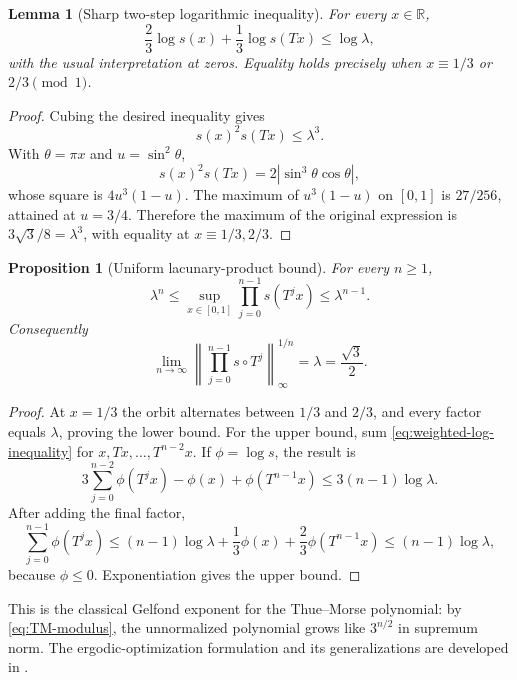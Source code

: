 \documentclass[11pt,oneside]{article}
\newtheorem{proposition}[proposition]{Proposition}
\newtheorem{lemma}[lemma]{Lemma}
\theoremstyle{definition}
\theoremstyle{remark}
\newcommand{\R}{\mathbb R}
\newcommand{\abs}[1]{\left|#1\right|}
\newcommand{\norm}[1]{\left\lVert#1\right\rVert}
\begin{document}
\begin{lemma}[Sharp two-step logarithmic inequality]
\label{lem:sharp-sine-inequality}
For every $x\in\R$,
\begin{equation}
 \frac23\log s(x)+\frac13\log s(Tx)\le\log\lambda,
 \label{eq:weighted-log-inequality}
\end{equation}
with the usual interpretation at zeros.  Equality holds precisely when
$x\equiv1/3$ or $2/3\pmod1$.
\end{lemma}

\begin{proof}
Cubing the desired inequality gives
\[
 s(x)^2s(Tx)\le\lambda^3.
\]
With $\theta=\pi x$ and $u=\sin^2\theta$,
\[
 s(x)^2s(Tx)=2\abs{\sin^3\theta\cos\theta},
\]
whose square is $4u^3(1-u)$.  The maximum of $u^3(1-u)$ on $[0,1]$ is $27/256$, attained
at $u=3/4$.  Therefore the maximum of the original expression is
$3\sqrt3/8=\lambda^3$, with equality at $x\equiv1/3,2/3$.
\end{proof}

\begin{proposition}[Uniform lacunary-product bound]
\label{prop:Bn-uniform}
For every $n\ge1$,
\begin{equation}
 \lambda^n\le\sup_{x\in[0,1]}
 \prod_{j=0}^{n-1}s(T^jx)\le\lambda^{n-1}.
 \label{eq:Bn-uniform}
\end{equation}
Consequently
\begin{equation}
 \lim_{n\to\infty}\norm{\prod_{j=0}^{n-1}s\circ T^j}_{\infty}^{1/n}
 =\lambda=\frac{\sqrt3}{2}.
 \label{eq:Gelfond-rate}
\end{equation}
\end{proposition}

\begin{proof}
At $x=1/3$ the orbit alternates between $1/3$ and $2/3$, and every factor equals
$\lambda$, proving the lower bound.  For the upper bound, sum
\eqref{eq:weighted-log-inequality} for $x,Tx,\dots,T^{n-2}x$.  If
$\phi=\log s$, the result is
\[
 3\sum_{j=0}^{n-2}\phi(T^jx)-\phi(x)+\phi(T^{n-1}x)
 \le3(n-1)\log\lambda.
\]
After adding the final factor,
\[
 \sum_{j=0}^{n-1}\phi(T^jx)
 \le(n-1)\log\lambda+\frac13\phi(x)+\frac23\phi(T^{n-1}x)
 \le(n-1)\log\lambda,
\]
because $\phi\le0$.  Exponentiation gives the upper bound.
\end{proof}

This is the classical Gelfond exponent for the Thue--Morse polynomial: by
\eqref{eq:TM-modulus}, the unnormalized polynomial grows like $3^{n/2}$ in supremum norm.
The ergodic-optimization formulation and its generalizations are developed in
\cite{fan-schmeling-shen}.
\end{document}
